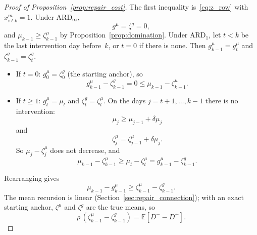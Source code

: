 \documentclass[11pt,a4paper]{article}
\theoremstyle{plain}
\theoremstyle{definition}
\theoremstyle{remark}
\begin{document}
\label{prf:prop:repair_cost}
\begin{proof}[Proof of Proposition~\ref{prop:repair_cost}]
The first inequality is~\eqref{eq:z_row} with $x^m_{i\ell k} = 1$.
Under $\text{ARD}_\infty$,
\begin{equation}
  g^{\mu} = \zeta^{g} = 0,
\end{equation}
and $\mu_{k-1} \ge \zeta^{\mu}_{k-1}$ by Proposition~\ref{prop:domination}.
Under $\text{ARD}_1$, let $t < k$ be the last intervention day before~$k$, or $t = 0$ if there is none.
Then $g^{\mu}_{k-1} = g^{\mu}_t$ and $\zeta^{g}_{k-1} = \zeta^{g}_t$.
\begin{itemize}
  \item If $t = 0$: $g^{\mu}_0 = \zeta^{g}_0$ (the starting anchor), so
    \begin{equation}
      g^{\mu}_{k-1} - \zeta^{g}_{k-1} = 0 \le \mu_{k-1} - \zeta^{\mu}_{k-1}.
    \end{equation}
  \item If $t \ge 1$: $g^{\mu}_t = \mu_t$ and $\zeta^{g}_t = \zeta^{\mu}_t$.
    On the days $j = t+1, \ldots, k-1$ there is no intervention:
    \begin{equation}
      \mu_j \ge \mu_{j-1} + \delta\mu_j
    \end{equation}
    and
    \begin{equation}
      \zeta^{\mu}_j = \zeta^{\mu}_{j-1} + \delta\mu_j.
    \end{equation}
    So $\mu_j - \zeta^{\mu}_j$ does not decrease, and
    \begin{equation}
      \mu_{k-1} - \zeta^{\mu}_{k-1} \ge \mu_t - \zeta^{\mu}_t = g^{\mu}_{k-1} - \zeta^{g}_{k-1}.
    \end{equation}
\end{itemize}
Rearranging gives
\begin{equation}
  \mu_{k-1} - g^{\mu}_{k-1} \ge \zeta^{\mu}_{k-1} - \zeta^{g}_{k-1}.
\end{equation}
The mean recursion is linear (Section~\ref{sec:repair_connection}); with an exact starting anchor, $\zeta^{\mu}$ and $\zeta^{g}$ are the true means, so
\begin{equation}
  \rho\,(\zeta^{\mu}_{k-1} - \zeta^{g}_{k-1}) = \mathbb{E}[D^- - D^+].
\end{equation}
\end{proof}
\end{document}
